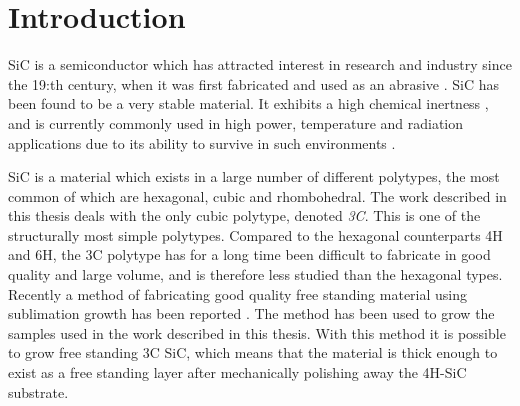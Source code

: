 
\chapter{Introduction}






SiC is a semiconductor which has attracted interest in research and industry since the 19:th century, when it was first fabricated and used as an abrasive \cite{Acheson1893}. SiC has been found to be a very stable material. It exhibits a high chemical inertness \cite{Hume1941}, and is currently commonly used in high power, temperature and radiation applications due to its ability to survive in such environments \cite{J.B.CASADYandR.W.JOHNSON1996}. 

SiC is a material which exists in a large number of different polytypes, the most common of which are hexagonal, cubic and rhombohedral. The work described in this thesis deals with the only cubic polytype, denoted \emph{3C}. This is one of the structurally most simple polytypes. Compared to the hexagonal counterparts 4H and 6H, the 3C polytype has for a long time been difficult to fabricate in good quality and large volume, and is therefore less studied than the hexagonal types. Recently a method of fabricating good quality free standing material using sublimation growth has been reported \cite{Jokubavicius2014}. The method has been used to grow the samples used in the work described in this thesis. With this method it is possible to grow free standing 3C SiC, which means that the material is thick enough to exist as a free standing layer after mechanically polishing away the 4H-SiC substrate. %

